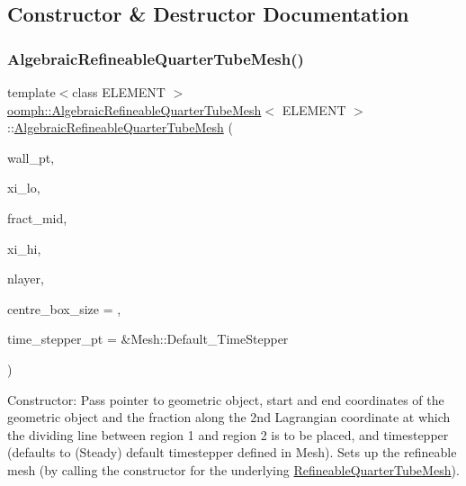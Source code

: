 \subsection{Constructor \& Destructor Documentation}
\mbox{\label{classoomph_1_1AlgebraicRefineableQuarterTubeMesh_ad8ff9f32d4d180d815da65ddc3c4b90a}} 
\subsubsection{\texorpdfstring{Algebraic\+Refineable\+Quarter\+Tube\+Mesh()}{AlgebraicRefineableQuarterTubeMesh()}}
{\footnotesize\ttfamily template$<$class E\+L\+E\+M\+E\+NT $>$ \\
\hyperlink{classoomph_1_1AlgebraicRefineableQuarterTubeMesh}{oomph\+::\+Algebraic\+Refineable\+Quarter\+Tube\+Mesh}$<$ E\+L\+E\+M\+E\+NT $>$\+::\hyperlink{classoomph_1_1AlgebraicRefineableQuarterTubeMesh}{Algebraic\+Refineable\+Quarter\+Tube\+Mesh} (\begin{DoxyParamCaption}\item[{Geom\+Object $\ast$}]{wall\+\_\+pt,  }\item[{const Vector$<$ double $>$ \&}]{xi\+\_\+lo,  }\item[{const double \&}]{fract\+\_\+mid,  }\item[{const Vector$<$ double $>$ \&}]{xi\+\_\+hi,  }\item[{const unsigned \&}]{nlayer,  }\item[{const double}]{centre\+\_\+box\+\_\+size = {},  }\item[{Time\+Stepper $\ast$}]{time\+\_\+stepper\+\_\+pt = {\ttfamily \&Mesh\+:\+:Default\+\_\+TimeStepper} }\end{DoxyParamCaption})\hspace{0.3cm}{\ttfamily [inline]}}



Constructor\+: Pass pointer to geometric object, start and end coordinates of the geometric object and the fraction along the 2nd Lagrangian coordinate at which the dividing line between region 1 and region 2 is to be placed, and timestepper (defaults to (Steady) default timestepper defined in Mesh). Sets up the refineable mesh (by calling the constructor for the underlying \hyperlink{classoomph_1_1RefineableQuarterTubeMesh}{Refineable\+Quarter\+Tube\+Mesh}). 



